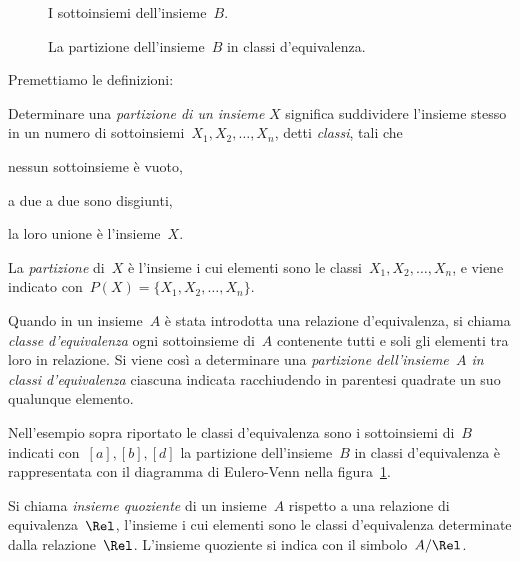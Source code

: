\begin{inaccessibleblock}
 \begin{figure}[t]
\begin{minipage}[t]{.45\textwidth}
 \centering
 
 \caption{I sottoinsiemi dell'insieme~$B$.}\label{fig:B.9}
\end{minipage}\hfil
\begin{minipage}[t]{.45\textwidth}
 \centering
 
 \caption{La partizione dell'insieme~$B$ in classi 
d'equivalenza.}\label{fig:B.10}
\end{minipage}
\end{figure}
\end{inaccessibleblock}

Premettiamo le definizioni:

\begin{definizione}
Determinare una \emph{partizione di un insieme} $X$ significa suddividere 
l'insieme stesso in un numero di sottoinsiemi~$X_1, X_2, \ldots, X_n$, detti 
\emph{classi}, tali che
\begin{enumeratea}
\item nessun sottoinsieme è vuoto,
\item a due a due sono disgiunti,
\item la loro unione è l'insieme~$X$.
\end{enumeratea}
La \emph{partizione} di~$X$ è l'insieme i cui elementi sono le classi~$X_1, X_2, 
\ldots, X_n$, e viene indicato con~$P(X) = \lbrace X_1, X_2, \ldots, X_n 
\rbrace$.
\end{definizione}

\begin{definizione}
Quando in un insieme~$A$ è stata introdotta una relazione d'equivalenza, si 
chiama \emph{classe d'equivalenza} ogni sottoinsieme di~$A$ contenente tutti e 
soli gli elementi
tra loro in relazione. Si viene così a determinare una \emph{partizione 
dell'insieme~$A$ in classi d'equivalenza} ciascuna indicata racchiudendo in 
parentesi quadrate
un suo qualunque elemento.
\end{definizione}

Nell'esempio sopra riportato le classi d'equivalenza sono i sottoinsiemi di~$B$ 
indicati con~$[a], [b], [d]$ la
partizione dell'insieme~$B$ in classi d'equivalenza è rappresentata con il 
diagramma di Eulero-Venn nella figura~\ref{fig:B.10}.

\begin{definizione}
Si chiama \emph{insieme quoziente} di un insieme~$A$ rispetto a una relazione di 
equivalenza~$\Rel$,
l'insieme i cui elementi sono le classi d'equivalenza determinate dalla 
relazione~$\Rel$. L'insieme quoziente si indica con il simbolo~$A/\Rel$.
\end{definizione}

